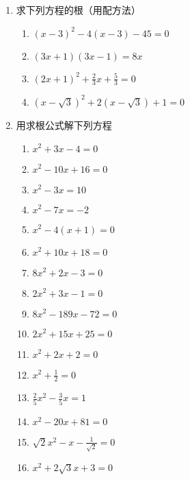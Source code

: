 \begin{enumerate}
\item 求下列方程的根（用配方法）
\begin{multicols}{2}
    \begin{enumerate}
\item $(x-3)^2-4(x-3)-45=0$
\item $(3x+1)(3x-1)=8x$
\item $(2x+1)^2+\frac{2}{3}x+\frac{5}{3}=0$
\item $(x-\sqrt{3})^2+2(x-\sqrt{3})+1=0$
\end{enumerate}
\end{multicols}
\item 用求根公式解下列方程
\begin{multicols}{2}
    \begin{enumerate}
\item $x^2+3x-4=0$
\item $x^2-10x+16=0$
\item $x^2-3x=10$
\item $x^2-7x=-2$
\item $x^2-4(x+1)=0$
\item $x^2+10x+18=0$
\item $8x^2+2x-3=0$ 
\item $2x^2+3x-1=0$
\item $8x^2-189x-72=0$
\item $2x^2+15x+25=0$
\item  $x^2+2x+2=0$
\item $x^2+\frac{1}{2}=0$
\item $\frac{2}{5}x^2-\frac{3}{5}x=1$
\item $x^2-20x+81=0$
\item $\sqrt{2}x^2-x-\frac{1}{\sqrt{2}}=0$
\item $x^2+2\sqrt{3}x+3=0$
\end{enumerate}
\end{multicols}


\end{enumerate}
